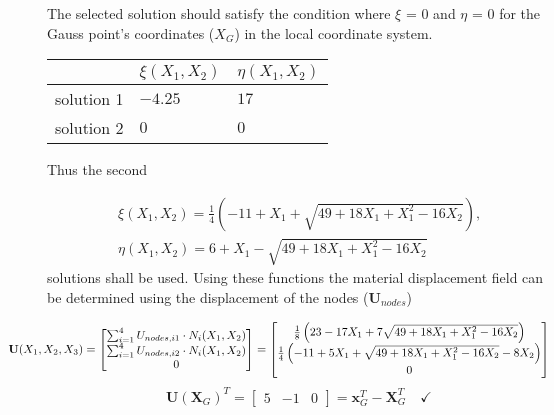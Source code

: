 \documentclass[12pt]{article}
\begin{document}
\newpage
The selected solution should satisfy the condition where $\xi$ = 0 and $\eta$ = 0 for the Gauss point's coordinates ($X_G$)
 in the local coordinate system. 
 \begin{table}[ht!]
  \begin{center}
    \label{table:sol_val}
  \begin{tabular}{cll}
             & $\xi(X_1, X_2)$                                                            & $\eta(X_1, X_2)$                               \\ \hline
  solution 1 & $-4.25$ & $17$ \\
  solution 2 & $0$ & $0 $
  \end{tabular}
  \end{center}
\end{table}

Thus the second

\begin{gather}
  \xi(X_1, X_2) = \frac{1}{4} \left(-11 + X_1 + \sqrt{49 + 18 X_1 + X_1^2 - 16 X_2}\right)  \text{,}\\
  \eta(X_1, X_2) = 6 + X_1 - \sqrt{49 + 18 X_1 + X_1^2 - 16 X_2}
\end{gather}
solutions shall be used. Using these functions the material displacement field can be determined using the displacement of the nodes ($\textbf{U}_{nodes}$)

\begin{equation}
  \hspace{-1.2 cm}
  \textbf{U}(X_1, X_2, X_3) = \begin{bmatrix}
  \sum_{i=1}^{4} U_{nodes,i1} \cdot N_i(X_1, X_2)\\
  \sum_{i=1}^{4} U_{nodes,i2} \cdot N_i(X_1, X_2)\\
  0
  \end{bmatrix} = \begin{bmatrix}
    \frac{1}{8} \left(23 - 17X_1 + 7\sqrt{49 + 18X_1 + X_1^2 - 16X_2} \right) \\
    \frac{1}{4} \left(-11 + 5X_1 + \sqrt{49 + 18X_1 + X_1^2 - 16X_2} - 8X_2\right)\\
    0
 \end{bmatrix}
\end{equation}
\begin{equation}
  \textbf{U}(\textbf{X}_G)^T = \begin{bmatrix}
    5 & -1 & 0
  \end{bmatrix} = \textbf{x}_G^T - \textbf{X}_G^T \quad \checkmark
\end{equation}
\end{document}
